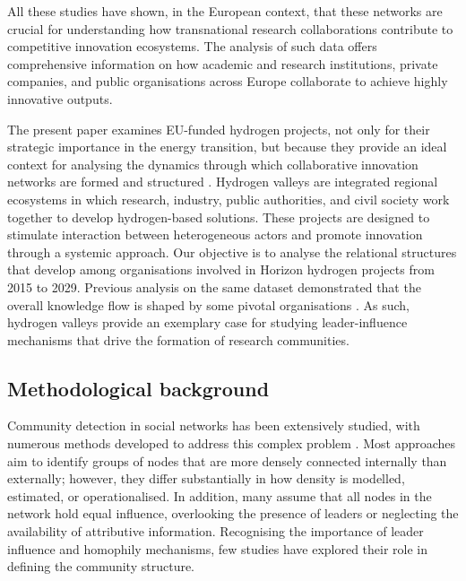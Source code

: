 \documentclass[11pt]{article}
\begin{document}
All these studies have shown, in the European context, that these networks are crucial for understanding how transnational research collaborations contribute to competitive innovation ecosystems.
The analysis of such data offers comprehensive information on how academic and research institutions, private companies, and public organisations across Europe collaborate to achieve highly innovative outputs.  

The present paper examines EU-funded hydrogen projects, not only for their strategic importance in the energy transition, but because they provide an ideal context for analysing the dynamics through which collaborative innovation networks are formed and structured \citep{Morea}. Hydrogen valleys are integrated regional ecosystems in which research, industry, public authorities, and civil society work together to develop hydrogen-based solutions. These projects are designed to stimulate interaction between heterogeneous actors and promote innovation through a systemic approach. 
Our objective is to analyse the relational structures that develop among organisations involved in Horizon hydrogen projects from 2015 to 2029. Previous analysis on the same dataset demonstrated that the overall knowledge flow is shaped by some pivotal organisations \citep{Morea2024MappingAnalysis}. As such, hydrogen valleys provide an exemplary case for studying leader-influence mechanisms that drive the formation of research communities. 

\subsection{Methodological background}

Community detection in social networks has been extensively studied, with numerous methods developed to address this complex problem \citep{Fortunato2016CommunityGuide, Rosvall2019DifferentDetection,Morea2025SolutionSpace}. 
Most approaches aim to identify groups of nodes that are more densely connected internally than externally; however, they differ substantially in how density is modelled, estimated, or operationalised. 
In addition,  many assume that all nodes in the network hold equal influence, overlooking the presence of leaders or neglecting the availability of attributive information. Recognising the importance of leader influence and homophily mechanisms, few studies have explored their role in defining the community structure. 
\end{document}
